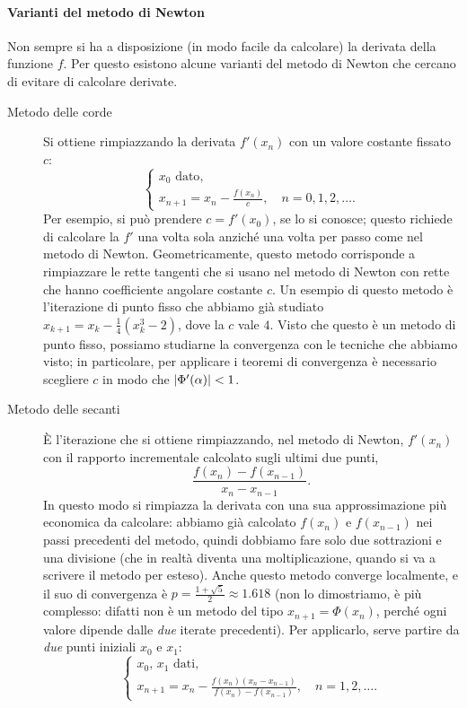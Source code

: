 \documentclass[a4paper]{report}
\DeclarePairedDelimiter{\abs}{\lvert}{\rvert}
\theoremstyle{definiton}
\theoremstyle{remark}
\begin{document}
\paragraph{Varianti del metodo di Newton} Non sempre si ha a disposizione (in modo facile da calcolare) la derivata della funzione $f$. Per questo esistono alcune varianti del metodo di Newton che cercano di evitare di calcolare derivate.
\begin{description}
    \item[Metodo delle corde] Si ottiene rimpiazzando la derivata $f'(x_n)$ con un valore costante fissato $c$:
        \[
            \begin{cases}
                \text{$x_0$ dato},\\
                x_{n+1} = x_n - \frac{f(x_n)}{c}, \quad n=0,1,2,\dots.
            \end{cases}
        \]    
    Per esempio, si può prendere $c = f'(x_0)$, se lo si conosce; questo richiede di calcolare la $f'$ una volta sola anziché una volta per passo come nel metodo di Newton. Geometricamente, questo metodo corrisponde a rimpiazzare le rette tangenti che si usano nel metodo di Newton con rette che hanno coefficiente angolare costante $c$. Un esempio di questo metodo è l'iterazione di punto fisso che abbiamo già studiato $x_{k+1} = x_{k} - \frac14 (x_k^3-2)$, dove la $c$ vale $4$. Visto che questo è un metodo di punto fisso, possiamo studiarne la convergenza con le tecniche che abbiamo visto; in particolare, per applicare i teoremi di convergenza è necessario scegliere $c$ in modo che $\abs{\Phi'(\alpha)} < 1$.
    \item[Metodo delle secanti] È l'iterazione che si ottiene rimpiazzando, nel metodo di Newton, $f'(x_n)$ con il rapporto incrementale calcolato sugli ultimi due punti,
    \[
    \frac{f(x_n) - f(x_{n-1})}{x_n - x_{n-1}}.
    \]
    In questo modo si rimpiazza la derivata con una sua approssimazione più economica da calcolare: abbiamo già calcolato $f(x_n)$ e $f(x_{n-1})$ nei passi precedenti del metodo, quindi dobbiamo fare solo due sottrazioni e una divisione (che in realtà diventa una moltiplicazione, quando si va a scrivere il metodo per esteso). Anche questo metodo converge localmente, e il suo di convergenza è $p = \frac{1+\sqrt{5}}{2} \approx 1.618$ (non lo dimostriamo, è più complesso: difatti non è un metodo del tipo $x_{n+1} = \Phi(x_n)$, perché ogni valore dipende dalle \emph{due} iterate precedenti). Per applicarlo, serve partire da \emph{due} punti iniziali $x_0$ e $x_1$:
    \[
    \begin{cases}
        \text{$x_0$, $x_1$ dati},\\
        x_{n+1} = x_n - \frac{f(x_n) (x_n - x_{n-1})}{f(x_n) - f(x_{n-1})}, \quad n=1,2,\dots.
    \end{cases}
    \]
\end{description}
\end{document}

